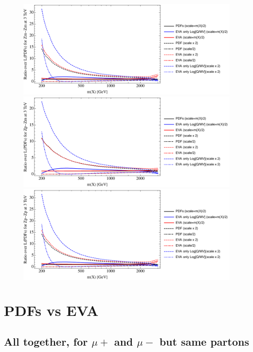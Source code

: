 \documentclass[a4paper,11pt]{article}
\begin{document}
\begin{figure}[ht]
\includegraphics[width=0.46\linewidth]{PlotLumi/3TeV/ratios/Zm-Zm.pdf}
\includegraphics[width=0.46\linewidth]{PlotLumi/3TeV/ratios/Zp-Zm.pdf}
\includegraphics[width=0.46\linewidth]{PlotLumi/3TeV/ratios/Zp-Zp.pdf}
\end{figure}



\clearpage
\section{PDFs vs EVA}

\subsection{All together, for $\mu+$ and $\mu-$ but same partons}
\end{document}
